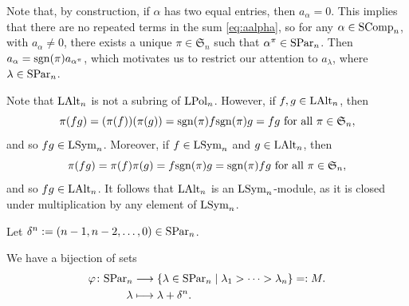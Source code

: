 \documentclass[11pt]{amsart}
\begin{document}
\begin{rem} \label{rem:1aalpha}
    Note that, by construction, if $\alpha$ has two equal entries, then $a_\alpha = 0$. This implies that there are no repeated terms in the sum \cref{eq:aalpha}, so for any $\alpha \in \mathrm{SComp}_n$, with $a_\alpha \neq 0$, there exists a unique $\pi \in \mathfrak{S}_n$ such that $\alpha^\pi \in \mathrm{SPar}_n$. Then $a_\alpha = \mathrm{sgn}(\pi)a_{\alpha^\pi}$, which motivates us to restrict our attention to $a_\lambda$, where $\lambda \in \mathrm{SPar}_n$.
\end{rem}
    Note that $\mathrm{LAlt}_n$ is not a subring of $\mathrm{LPol}_n$. However, if $f , g  \in \mathrm{LAlt}_n$, then
\[
\pi(fg) = (\pi(f))(\pi(g))=\mathrm{sgn}(\pi)f\mathrm{sgn}(\pi)g = fg \text{ for all } \pi \in \mathfrak{S}_n,
\]
and so $fg \in \mathrm{LSym}_n$. Moreover, if $f \in \mathrm{LSym}_n$ and $g \in \mathrm{LAlt}_n$, then
\[
\pi(fg) = \pi(f) \pi(g)=f\mathrm{sgn}(\pi)g = \mathrm{sgn}(\pi)fg \text{ for all } \pi \in \mathfrak{S}_n,
\]
and so $fg \in \mathrm{LAlt}_n$. It follows that $\mathrm{LAlt}_n$ is an $\mathrm{LSym}_n$-module, as it is closed under multiplication by any element of $\mathrm{LSym}_n$.

Let $\delta^n:=(n-1, n-2, \dots, 0) \in \mathrm{SPar}_n$. 

\begin{lem}\label{lem:lamdel}
    We have a bijection of sets 
\begin{align*}
        \varphi\colon \mathrm{SPar}_n &\longrightarrow \{ \lambda \in \mathrm{SPar}_n \mid \lambda_1 > \cdots > \lambda_n \} =:M. \\
        \lambda & \longmapsto \lambda + \delta^n.
\end{align*}
\end{lem}
\end{document}
